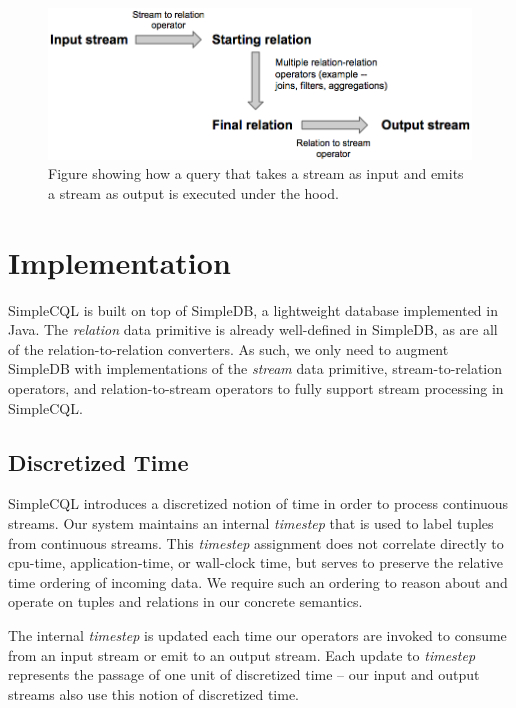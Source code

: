 \documentclass[a4paper, 10pt, conference]{IEEEconf}
\begin{document}
\begin{figure}[h!]
    \centering
    \centerline{\includegraphics[totalheight=2.5cm]{operators.png}}
    \caption{Figure showing how a query that takes a stream as input and emits a stream as output is executed under the hood.}
    \label{fig:operators}
\end{figure}


\section{Implementation}
SimpleCQL is built on top of SimpleDB, a lightweight database implemented in Java. The \textit{relation} data primitive is already well-defined in SimpleDB, as are all of the relation-to-relation converters. As such, we only need to augment SimpleDB with implementations of the \textit{stream} data primitive, stream-to-relation operators, and relation-to-stream operators to fully support stream processing in SimpleCQL. 

\subsection{Discretized Time}
SimpleCQL introduces a discretized notion of time in order to process continuous streams. Our system maintains an internal \textit{timestep} that is used to label tuples from continuous streams. This \textit{timestep} assignment does not correlate directly to cpu-time, application-time, or wall-clock time, but serves to preserve the relative time ordering of incoming data. We require such an ordering to reason about and operate on tuples and relations in our concrete semantics.

The internal \textit{timestep} is updated each time our operators are invoked to consume from an input stream or emit to an output stream. Each update to \textit{timestep} represents the passage of one unit of discretized time -- our input and output streams also use this notion of discretized time. 
\end{document}
